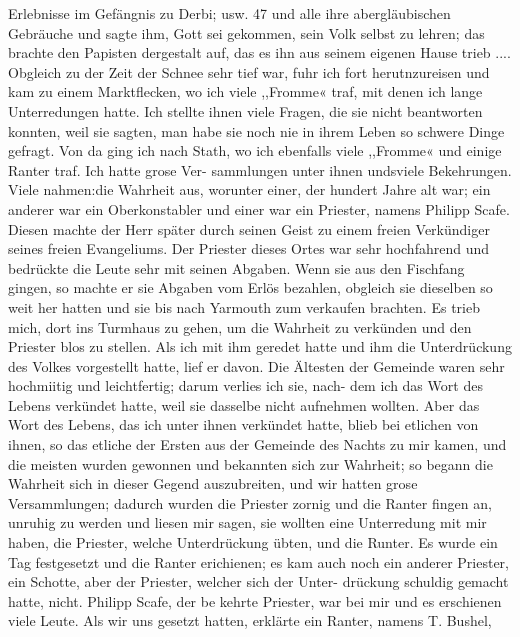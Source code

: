 Erlebnisse im Gefängnis zu Derbi; usw. 47
und alle ihre abergläubischen Gebräuche und sagte ihm, Gott sei
gekommen, sein Volk selbst zu lehren; das brachte den Papisten
dergestalt auf, das es ihn aus seinem eigenen Hause trieb ....
Obgleich zu der Zeit der Schnee sehr tief war, fuhr ich fort
herutnzureisen und kam zu einem Marktflecken, wo ich viele
,,Fromme« traf, mit denen ich lange Unterredungen hatte. Ich
stellte ihnen viele Fragen, die sie nicht beantworten konnten, weil
sie sagten, man habe sie noch nie in ihrem Leben so schwere
Dinge gefragt. Von da ging ich nach Stath, wo ich ebenfalls
viele ,,Fromme« und einige Ranter traf. Ich hatte grose Ver-
sammlungen unter ihnen undsviele Bekehrungen. Viele nahmen:die
Wahrheit aus, worunter einer, der hundert Jahre alt war; ein
anderer war ein Oberkonstabler und einer war ein Priester, namens
Philipp Scafe. Diesen machte der Herr später durch seinen Geist
zu einem freien Verkündiger seines freien Evangeliums.
Der Priester dieses Ortes war sehr hochfahrend und bedrückte
die Leute sehr mit seinen Abgaben. Wenn sie aus den Fischfang
gingen, so machte er sie Abgaben vom Erlös bezahlen, obgleich
sie dieselben so weit her hatten und sie bis nach Yarmouth zum
verkaufen brachten. Es trieb mich, dort ins Turmhaus zu gehen,
um die Wahrheit zu verkünden und den Priester blos zu stellen.
Als ich mit ihm geredet hatte und ihm die Unterdrückung des
Volkes vorgestellt hatte, lief er davon. Die Ältesten der Gemeinde
waren sehr hochmiitig und leichtfertig; darum verlies ich sie, nach-
dem ich das Wort des Lebens verkündet hatte, weil sie dasselbe
nicht aufnehmen wollten. Aber das Wort des Lebens, das ich
unter ihnen verkündet hatte, blieb bei etlichen von ihnen, so das
etliche der Ersten aus der Gemeinde des Nachts zu mir kamen,
und die meisten wurden gewonnen und bekannten sich zur Wahrheit;
so begann die Wahrheit sich in dieser Gegend auszubreiten, und
wir hatten grose Versammlungen; dadurch wurden die Priester
zornig und die Ranter fingen an, unruhig zu werden und liesen
mir sagen, sie wollten eine Unterredung mit mir haben, die Priester,
welche Unterdrückung übten, und die Runter. Es wurde ein Tag
festgesetzt und die Ranter erichienen; es kam auch noch ein anderer
Priester, ein Schotte, aber der Priester, welcher sich der Unter-
drückung schuldig gemacht hatte, nicht. Philipp Scafe, der be
kehrte Priester, war bei mir und es erschienen viele Leute. Als
wir uns gesetzt hatten, erklärte ein Ranter, namens T. Bushel,


